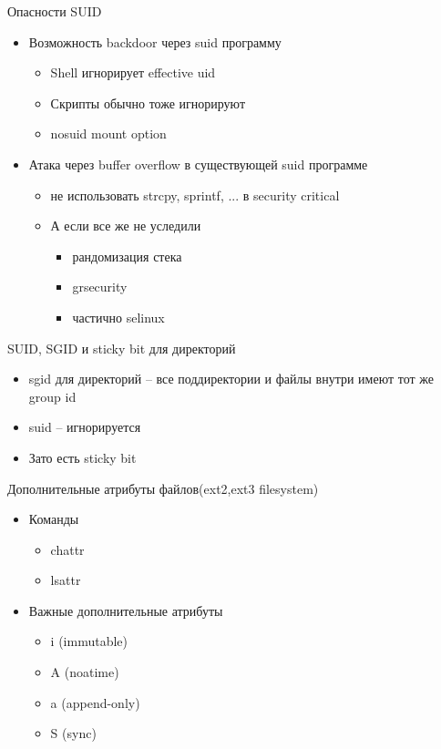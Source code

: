 \documentclass[ignorenonframetext, professionalfonts, hyperref={pdftex, unicode}]{beamer}
\begin{document}
\begin{frame}{Опасности SUID}
  \begin{itemize}
    \item Возможность backdoor через suid программу
      \begin{itemize}
        \item Shell игнорирует effective uid
        \item Скрипты обычно тоже игнорируют
        \item nosuid mount option
       \end{itemize}
     \item Атака через buffer overflow в существующей suid программе
       \begin{itemize}
         \item не использовать strcpy, sprintf, ... в security critical
         \item А если все же не уследили
           \begin{itemize}
             \item рандомизация стека
             \item grsecurity
             \item частично selinux
           \end{itemize}
       \end{itemize}
   \end{itemize}
\end{frame}


\begin{frame}{SUID, SGID и sticky bit для директорий}
  \begin{itemize}
    \item sgid для директорий -- все поддиректории и файлы внутри имеют тот же group id
    \item suid -- игнорируется
    \item Зато есть sticky bit 
   \end{itemize}
\end{frame}

\begin{frame}{Дополнительные атрибуты файлов(ext2,ext3 filesystem)}
  \begin{itemize}
    \item Команды
      \begin{itemize}
        \item chattr
        \item lsattr
       \end{itemize}
     \item Важные дополнительные атрибуты
       \begin{itemize}
         \item i (immutable)
         \item A (noatime)
         \item a (append-only)
         \item S (sync)
        \end{itemize}
    \end{itemize}
\end{frame}
\end{document}
